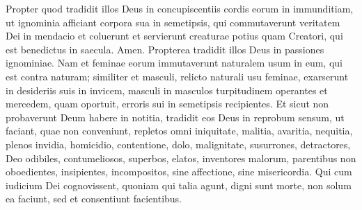\begin{biblechapter}
\verse Propter quod tradidit illos Deus in concupiscentiis cordis eorum in immunditiam, ut ignominia afficiant corpora sua in semetipsis, 
\verse qui commutaverunt veritatem Dei in mendacio et coluerunt et servierunt creaturae potius quam Creatori, qui est benedictus in saecula. Amen. 
\verse Propterea tradidit illos Deus in passiones ignominiae. Nam et feminae eorum immutaverunt naturalem usum in eum, qui est contra naturam; 
\verse similiter et masculi, relicto naturali usu feminae, exarserunt in desideriis suis in invicem, masculi in masculos turpitudinem operantes et mercedem, quam oportuit, erroris sui in semetipsis recipientes. 
\verse Et sicut non probaverunt Deum habere in notitia, tradidit eos Deus in reprobum sensum, ut faciant, quae non conveniunt, 
\verse repletos omni iniquitate, malitia, avaritia, nequitia, plenos invidia, homicidio, contentione, dolo, malignitate, susurrones, 
\verse detractores, Deo odibiles, contumeliosos, superbos, elatos, inventores malorum, parentibus non oboedientes, 
\verse insipientes, incompositos, sine affectione, sine misericordia. 
\verse Qui cum iudicium Dei cognovissent, quoniam qui talia agunt, digni sunt morte, non solum ea faciunt, sed et consentiunt facientibus. 
\end{biblechapter}


